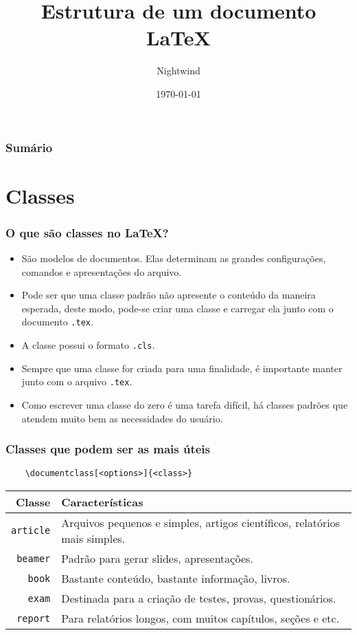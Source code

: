 \documentclass{beamer}
\title{Estrutura de um documento \LaTeX }
\author{Nightwind}
\institute[CTISM]{Colégio Técnico Industrial de Santa Maria}
\date{\today}
\begin{document}
\frame{\titlepage}

\begin{frame}
    \frametitle{Sumário}
    \tableofcontents
\end{frame}

\section{Classes}

\begin{frame}[fragile]
    \frametitle{O que são classes no \LaTeX?}

    \begin{itemize}
        \item São modelos de documentos. Elas determinam as grandes configurações, comandos e apresentações do arquivo.
        \item Pode ser que uma classe padrão não apresente o conteúdo da maneira esperada, deste modo, pode-se criar uma classe e carregar ela junto com o documento \lstinline[]!.tex!.
        \item A classe possui o formato \lstinline[]!.cls!.
        \item Sempre que uma classe for criada para uma finalidade, é importante manter junto com o arquivo \lstinline[]!.tex!.
        \item Como escrever uma classe do zero é uma tarefa difícil, há classes padrões que atendem muito bem as necessidades do usuário. 
    \end{itemize}

\end{frame}

\begin{frame}[fragile]
    \frametitle{Classes que podem ser as mais úteis}
\begin{lstlisting}
    \documentclass[<options>]{<class>}
\end{lstlisting}
\begin{tabularx}{\textwidth}{rX}
    \hline
    \textbf{Classe} & \textbf{Características} \\ \hline
    \lstinline[]!article! & Arquivos pequenos e simples, artigos científicos, relatórios mais simples. \\ \hline
    \lstinline[]!beamer! & Padrão para gerar slides, apresentações. \\ \hline
    \lstinline[]!book! & Bastante conteúdo, bastante informação, livros. \\ \hline
    \lstinline[]!exam! & Destinada para a criação de testes, provas, questionários. \\ \hline
    \lstinline[]!report! & Para relatórios longos, com muitos capítulos, seções e etc. \\ \hline
\end{tabularx}
\end{frame}
\end{document}
